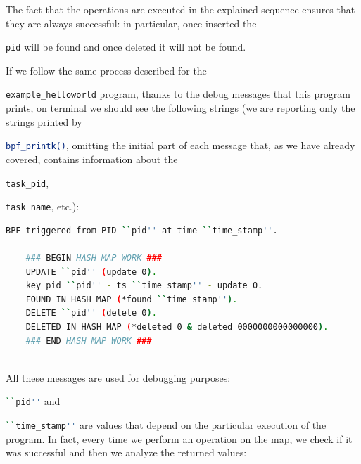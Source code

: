 The fact that the operations are executed in the explained sequence ensures that they are always successful: in particular, once inserted the \raggedright\colorbox{backcolour}{\lstinline[style=commandline, language=bash]|pid|} will be found and once deleted it will not be found.

If we follow the same process described for the \raggedright\colorbox{backcolour}{\lstinline[style=commandline, language=bash]|example_helloworld|} program, thanks to the debug messages that this program prints, on terminal we should see the following strings (we are reporting only the strings printed by \raggedright\colorbox{backcolour}{\lstinline[style=commandline, language=bash]|bpf_printk()|}, omitting the initial part of each message that, as we have already covered, contains information about the \raggedright\colorbox{backcolour}{\lstinline[style=commandline, language=bash]|task_pid|}, \raggedright\colorbox{backcolour}{\lstinline[style=commandline, language=bash]|task_name|}, etc.):

\begin{lstlisting}[style=commandline, language=bash, caption={Debug messages printed by the program that uses a map in libbpf-bootstrap.}]
	BPF triggered from PID ``pid'' at time ``time_stamp''.
	
	### BEGIN HASH MAP WORK ###
	UPDATE ``pid'' (update 0).
	key pid ``pid'' - ts ``time_stamp'' - update 0.
	FOUND IN HASH MAP (*found ``time_stamp'').
	DELETE ``pid'' (delete 0).
	DELETED IN HASH MAP (*deleted 0 & deleted 0000000000000000).
	### END HASH MAP WORK ###
	
\end{lstlisting}

All these messages are used for debugging purposes:  \raggedright\colorbox{backcolour}{\lstinline[style=commandline, language=bash]|``pid''|} and \raggedright\colorbox{backcolour}{\lstinline[style=commandline, language=bash]|``time_stamp''|} are values that depend on the particular execution of the program.
In fact, every time we perform an operation on the map, we check if it was successful and then we analyze the returned values:

